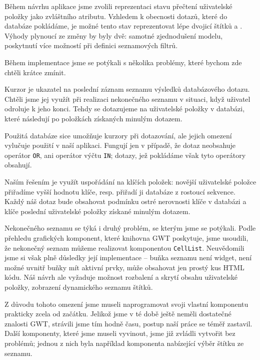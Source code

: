 Během návrhu aplikace jsme zvolili reprezentaci stavu přečtení uživatelské položky jako zvláštního atributu.
Vzhledem k obecnosti dotazů, které do databáze pokládáme, je možné tento stav reprezentovat lépe dvojicí štítků  a .
Výhody plynoucí ze změny by byly dvě: samotné zjednodušení modelu, poskytnutí více možností při definici seznamových filtrů.


Během implementace jsme se potýkali s několika problémy, které bychom zde chtěli krátce zmínit.


Kurzor je ukazatel na poslední záznam seznamu výsledků databázového dotazu.
Chtěli jsme jej využít při realizaci nekonečného seznamu v situaci, když uživatel odroluje k jeho konci.
Tehdy se dotazujeme na uživatelské položky v databázi, které následují po položkách získaných minulým dotazem.

Použitá databáze sice umožňuje kurzory při dotazování, ale jejich omezení vylučuje použití v naší aplikaci.
Fungují jen v případě, že dotaz neobsahuje operátor \verb|OR|, ani operátor výčtu \verb|IN|; dotazy, jež pokládáme však tyto operátory obsahují. 

Naším řešením je využít uspořádání na klíčích položek: novější uživatelské položce přiřadíme vyšší hodnotu klíče, resp. přiřadí ji databáze z rostoucí sekvence.
Každý náš dotaz bude obsahovat podmínku ostré nerovnosti klíče v databázi a klíče poslední uživatelské položky získané minulým dotazem.


Nekonečného seznamu se týká i druhý problém, se kterým jsme se potýkali.
Podle přehledu grafických komponent, které knihovna GWT poskytuje, jsme usoudili, že nekonečný seznam můžeme realizovat komponentou \verb|CellList|.
Neuvědomili jsme si však plně důsledky její implementace -- buňka seznamu není widget, není možné uvnitř buňky mít aktivní prvky, může obsahovat jen prostý kus HTML kódu.
Náš návrh ale vyžaduje možnost rozbalení a skrytí obsahu uživatelské položky, zobrazení dynamického seznamu štítků.

Z důvodu tohoto omezení jsme museli naprogramovat svoji vlastní komponentu prakticky zcela od začátku.
Jelikož jsme v té době ještě neměli dostatečné znalosti GWT, strávili jsme tím hodně času, postup naší práce se téměř zastavil.
Další komponenty, které jsme museli vyvinout, jsme již zvládli vytvořit bez problémů; jednou z nich byla například komponenta nabízející výběr štítku ze seznamu.

